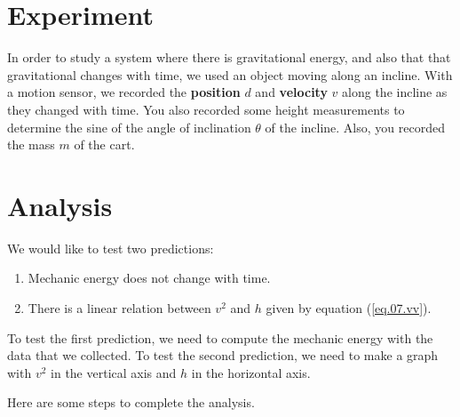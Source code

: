 \section{Experiment}
In order to study a system where there is gravitational energy, and also that that gravitational changes with time, we used an object moving along an incline. With a motion sensor, we recorded the \textbf{position} $d$ and \textbf{velocity} $v$ along the incline as they changed with time. You also recorded some height measurements to determine the sine of the angle of inclination $\theta$ of the incline. Also, you recorded the mass $m$ of the cart.
\section{Analysis}
We would like to test two predictions:
\begin{enumerate}
    \item Mechanic energy does not change with time.
    \item There is a linear relation between $v^{2}$ and $h$ given by equation (\ref{eq.07.vv}).
\end{enumerate}
To test the first prediction, we need to compute the mechanic energy with the data that we collected. To test the second prediction, we need to make a graph with $v^{2}$ in the vertical axis and $h$ in the horizontal axis.

Here are some steps to complete the analysis.
